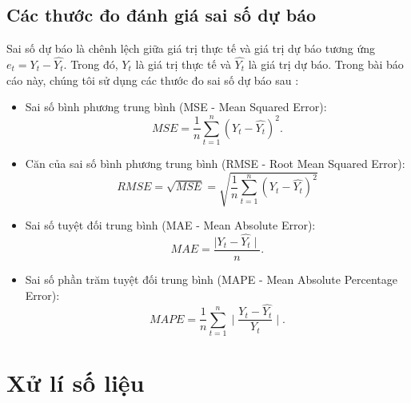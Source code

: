 \documentclass[12pt, a4paper,oneside]{book}
\theoremstyle{definition}
\begin{document}
\section{\label{TĐSS}Các thước đo đánh giá sai số dự báo}
Sai số dự báo là chênh lệch giữa giá trị thực tế và giá trị dự báo tương ứng $e_t = Y_t - \hat{Y_t}$. Trong đó, $Y_t$ là giá trị thực tế và $\hat{Y_t}$ là giá trị dự báo. Trong bài báo cáo này, chúng tôi sử dụng các thước đo sai số dự báo sau \cite{3,4}:
\begin{itemize}
\item Sai số bình phương trung bình (MSE - Mean Squared Error): 
$$MSE=\frac{1}{n}\sum_{t=1}^{n}(Y_t-\hat{Y_t})^2.$$

\item Căn của sai số bình phương trung bình (RMSE - Root Mean Squared Error):
$$RMSE=\sqrt{MSE}=\sqrt{\frac{1}{n}\sum_{t=1}^{n}(Y_t-\hat{Y_t})^2}  $$

\item Sai số  tuyệt đối trung bình  (MAE - Mean Absolute Error): 
$$ MAE=\dfrac{\mid Y_t-\hat{Y_t}\mid}{n}.$$

\item Sai số phần trăm tuyệt đối trung bình (MAPE - Mean Absolute Percentage Error): 
$$MAPE=\frac{1}{n}\sum_{t=1}^{n}\mid\dfrac{ Y_t-\hat{Y_t}}{Y_t}\mid.$$
\end{itemize}
\chapter{Xử lí số liệu}
\label{xlsl}
\end{document}
